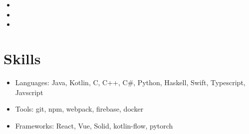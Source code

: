 \documentclass[10pt, a4paper]{article}
\begin{document}
\noindent
{
  \hfill
}
\vspace{-0.1in}
\begin{itemize}
  \item \lipsum[1][1]
        \vspace{-0.1in}
  \item \lipsum[1][2]
        \vspace{-0.1in}
  \item \lipsum[1][3]
        \vspace{-0.05in}
\end{itemize}

\vspace{-10pt}

\section*{Skills}
\begin{itemize}
  \item Languages: Java, Kotlin, C, C++, C\#, Python, Haskell, Swift, Typescript, Javscript
        \vspace{-0.1in}
  \item Tools: git, npm, webpack, firebase, docker
        \vspace{-0.1in}
  \item Frameworks: React, Vue, Solid, kotlin-flow, pytorch
        \vspace{-0.05in}
\end{itemize}
\end{document}
